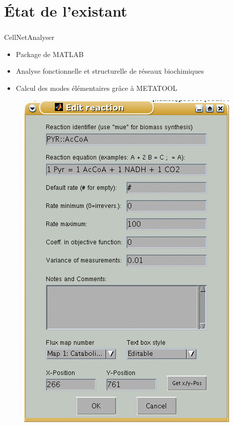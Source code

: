 \documentclass[11pt]{beamer}
\begin{document}
\section{État de l'existant}			

\begin{frame}
	\frametitle{\secname}
	\begin{minipage}{5cm}
	\begin{block}{CellNetAnalyser}
	\begin{itemize}
	\item Package de MATLAB
	\item Analyse fonctionnelle et structurelle de réseaux biochimiques
	\item Calcul des modes élémentaires grâce à METATOOL
	\end{itemize}
	\end{block}
	\end{minipage}
	\begin{minipage}{5cm}
	\begin{center}
	\begin{figure}[h]
	\includegraphics[scale=0.3]{cellnet.png}
		
	\end{figure}
	\end{center}
	\end{minipage}
		
\end{frame}
\end{document}
